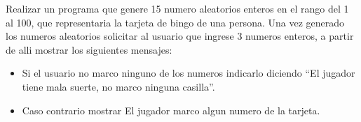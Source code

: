 Realizar un programa que genere 15 numero aleatorios enteros en el rango del 1 al 100, que representaria la tarjeta de bingo de una persona. Una vez generado los numeros aleatorios solicitar al usuario que ingrese 3 numeros enteros, a partir de alli mostrar los siguientes mensajes:

\begin{itemize}
	\item Si el usuario no marco ninguno de los numeros indicarlo diciendo ``El jugador tiene mala suerte, no marco ninguna casilla''.
	\item Caso contrario mostrar El jugador marco algun numero de la tarjeta.
\end{itemize}

